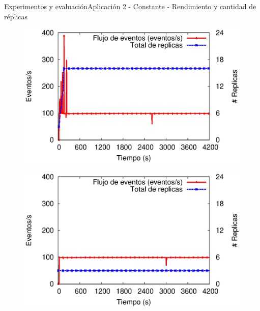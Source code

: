
\begin{frame}{Experimentos y evaluación}{Aplicación 2 - Constante - Rendimiento y cantidad de réplicas}

\begin{multicols}{2}
\begin{figure}[p]
	\centering
	\includegraphics[scale=0.4]{images/exp/app2/uniform/cm/processSystem.eps}
\end{figure}

\begin{figure}[p]
	\centering
	\includegraphics[scale=0.4]{images/exp/app2/uniform/sm/processSystem.eps}
\end{figure}
\end{multicols}
\end{frame}

